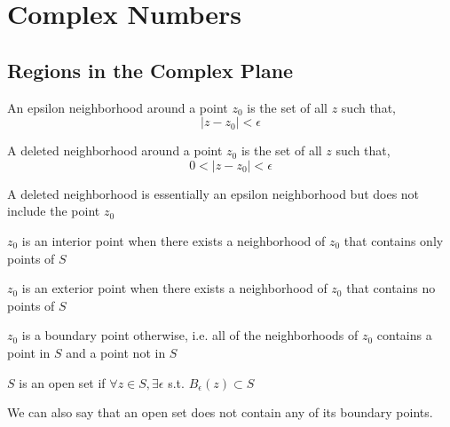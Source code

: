 
\chapter{Complex Numbers}
\setcounter{section}{11}
\section{Regions in the Complex Plane}

\begin{definition}
   
   An epsilon neighborhood around a point $z_0$ is the set of all  $z$ such that,
$$|z - z_0| < \epsilon$$   
\end{definition}

\begin{definition}
   A deleted neighborhood around a point $z_0$  is the set of all $z$ such that,
   $$0 < |z - z_0| < \epsilon$$
\end{definition}

\begin{remark}
A deleted neighborhood is essentially an epsilon neighborhood but does not include the point $z_0$
\end{remark}


\begin{definition}
$z_0$ is an interior point when there exists a neighborhood of $z_0$ that contains only points of $S$
\end{definition}

\begin{definition}
$z_0$ is an exterior point when there exists a neighborhood of $z_0$ that contains no points of $S$
\end{definition}


\begin{definition}
$z_0$ is a boundary point otherwise, i.e. all of the neighborhoods of $z_0$ contains a point in $S$ and a point not in $S$
\end{definition}

\begin{definition}
   $S$ is an open set if $\forall z \in S, \exists \epsilon$ s.t. $B_{\epsilon}(z) \subset S$ 
\end{definition}
\begin{remark}
   We can also say that an open set does not contain any of its boundary points.
\end{remark}

